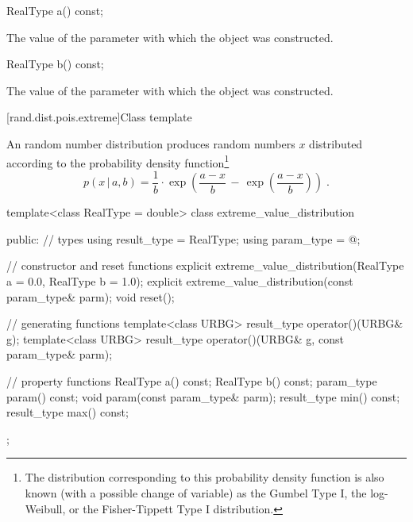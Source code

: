 %
\begin{itemdecl}
RealType a() const;
\end{itemdecl}

\begin{itemdescr}
\pnum\returns The value of the  parameter
 with which the object was constructed.
\end{itemdescr}

%
\begin{itemdecl}
RealType b() const;
\end{itemdecl}

\begin{itemdescr}
\pnum\returns The value of the  parameter
 with which the object was constructed.
\end{itemdescr}


[rand.dist.pois.extreme]{Class template }
%
%

\pnum
An  random number distribution
produces random numbers $x$
distributed according to
the probability density function\footnote{The distribution corresponding to
 this probability density function
 is also known
 (with a possible change of variable)
 as the Gumbel Type I,
 the log-Weibull,
 or the Fisher-Tippett Type I
 distribution.}%
%
\[%
 p(x\,|\,a,b)
      =       \frac{1}{b}
        \cdot \exp\left(  \frac{a-x}{b}
                       \,-\, \exp\left(\frac{a-x}{b}\right)
                  \right)
\; \mbox{.}
\]

%
\begin{codeblock}
template<class RealType = double>
 class extreme_value_distribution
{
public:
 // types
 using result_type = RealType;
 using param_type  = @\unspec@;

 // constructor and reset functions
 explicit extreme_value_distribution(RealType a = 0.0, RealType b = 1.0);
 explicit extreme_value_distribution(const param_type& parm);
 void reset();

 // generating functions
 template<class URBG>
   result_type operator()(URBG& g);
 template<class URBG>
   result_type operator()(URBG& g, const param_type& parm);

 // property functions
 RealType a() const;
 RealType b() const;
 param_type param() const;
 void param(const param_type& parm);
 result_type min() const;
 result_type max() const;
};
\end{codeblock}


